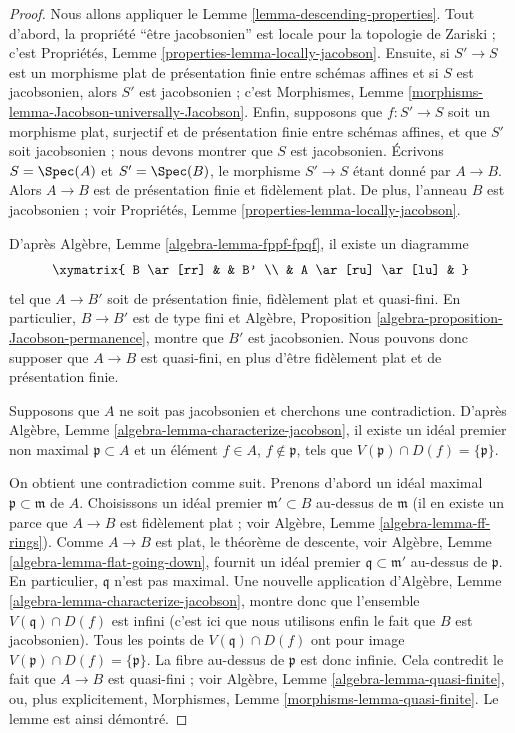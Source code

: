 \begin{proof}
Nous allons appliquer le Lemme \ref{lemma-descending-properties}.
Tout d'abord, la propriété ``être jacobsonien'' est locale pour la topologie
de Zariski ; c'est Propriétés, Lemme
\ref{properties-lemma-locally-jacobson}. Ensuite, si $S' \to S$ est un
morphisme plat de présentation finie entre schémas affines et si $S$ est
jacobsonien, alors $S'$ est jacobsonien ; c'est Morphismes, Lemme
\ref{morphisms-lemma-Jacobson-universally-Jacobson}. Enfin, supposons que
$f : S' \to S$ soit un morphisme plat, surjectif et de présentation finie
entre schémas affines, et que $S'$ soit jacobsonien ; nous devons montrer
que $S$ est jacobsonien. Écrivons $S = \Spec(A)$ et $S' = \Spec(B)$, le
morphisme $S' \to S$ étant donné par $A \to B$. Alors $A \to B$ est de
présentation finie et fidèlement plat. De plus, l'anneau $B$ est jacobsonien ;
voir Propriétés, Lemme \ref{properties-lemma-locally-jacobson}.

\medskip\noindent
D'après Algèbre, Lemme \ref{algebra-lemma-fppf-fpqf}, il existe un diagramme
$$
\xymatrix{
B \ar[rr] & & B' \\
& A \ar[ru] \ar[lu] &
}
$$
tel que $A \to B'$ soit de présentation finie, fidèlement plat et quasi-fini.
En particulier, $B \to B'$ est de type fini et Algèbre, Proposition
\ref{algebra-proposition-Jacobson-permanence}, montre que $B'$ est
jacobsonien. Nous pouvons donc supposer que $A \to B$ est quasi-fini, en plus
d'être fidèlement plat et de présentation finie.

\medskip\noindent
Supposons que $A$ ne soit pas jacobsonien et cherchons une contradiction.
D'après Algèbre, Lemme \ref{algebra-lemma-characterize-jacobson}, il existe
un idéal premier non maximal $\mathfrak p \subset A$ et un élément $f \in A$,
$f \not \in \mathfrak p$, tels que
$V(\mathfrak p) \cap D(f) = \{\mathfrak p\}$.

\medskip\noindent
On obtient une contradiction comme suit. Prenons d'abord un idéal maximal
$\mathfrak p \subset \mathfrak m$ de $A$. Choisissons un idéal premier
$\mathfrak m' \subset B$ au-dessus de $\mathfrak m$ (il en existe un parce
que $A \to B$ est fidèlement plat ; voir Algèbre, Lemme
\ref{algebra-lemma-ff-rings}). Comme $A \to B$ est plat, le théorème de
descente, voir Algèbre, Lemme \ref{algebra-lemma-flat-going-down}, fournit
un idéal premier $\mathfrak q \subset \mathfrak m'$ au-dessus de
$\mathfrak p$. En particulier, $\mathfrak q$ n'est pas maximal. Une nouvelle
application d'Algèbre, Lemme \ref{algebra-lemma-characterize-jacobson},
montre donc que l'ensemble $V(\mathfrak q) \cap D(f)$ est infini (c'est ici
que nous utilisons enfin le fait que $B$ est jacobsonien). Tous les points de
$V(\mathfrak q) \cap D(f)$ ont pour image
$V(\mathfrak p) \cap D(f) = \{\mathfrak p\}$. La fibre au-dessus de
$\mathfrak p$ est donc infinie. Cela contredit le fait que $A \to B$ est
quasi-fini ; voir Algèbre, Lemme \ref{algebra-lemma-quasi-finite}, ou, plus
explicitement, Morphismes, Lemme \ref{morphisms-lemma-quasi-finite}.
Le lemme est ainsi démontré.
\end{proof}


